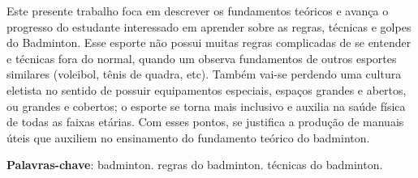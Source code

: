 \documentclass[
	article,			%
	11pt,				%
	oneside,			%
	a4paper,			%
	english,			%
	brazil,				%
	sumario=tradicional
	]{abntex2}
\begin{document}

\frenchspacing 


%
%


\maketitle




\begin{resumoumacoluna}
 Este presente trabalho foca em descrever os fundamentos teóricos e avança o progresso 
do estudante interessado em aprender sobre as regras, técnicas e golpes do Badminton.
Esse esporte não possui muitas regras complicadas de se entender e técnicas fora do
normal, quando um observa fundamentos de outros esportes similares (voleibol, tênis de quadra, etc).
Também vai-se perdendo uma cultura eletista no sentido de possuir equipamentos especiais,
espaços grandes e abertos, ou grandes e cobertos; o esporte se torna mais inclusivo e 
auxilia na saúde física de todas as faixas etárias. Com esses pontos, se justifica a
produção de manuais úteis que auxiliem no ensinamento do fundamento teórico do badminton.

 \vspace{\onelineskip}
 
 \noindent
 \textbf{Palavras-chave}: badminton. regras do badminton. técnicas do badminton.
\end{resumoumacoluna}
\end{document}
